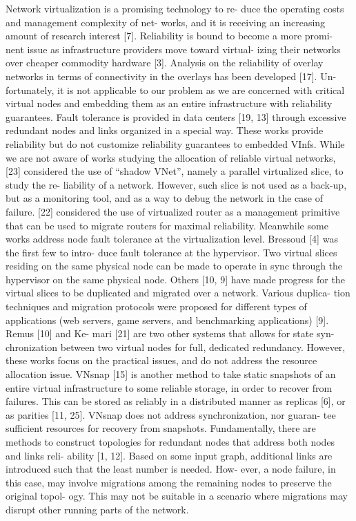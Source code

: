 

Network virtualization is a promising technology to re-
duce the operating costs and management complexity of net-
works, and it is receiving an increasing amount of research
interest [7]. Reliability is bound to become a more promi-
nent issue as infrastructure providers move toward virtual-
izing their networks over cheaper commodity hardware [3].
Analysis on the reliability of overlay networks in terms of
connectivity in the overlays has been developed [17]. Un-
fortunately, it is not applicable to our problem as we are
concerned with critical virtual nodes and embedding them
as an entire infrastructure with reliability guarantees.
Fault tolerance is provided in data centers [19, 13] through
excessive redundant nodes and links organized in a special
way. These works provide reliability but do not customize
reliability guarantees to embedded VInfs.
While we are not aware of works studying the allocation of
reliable virtual networks, [23] considered the use of “shadow
VNet”, namely a parallel virtualized slice, to study the re-
liability of a network. However, such slice is not used as a
back-up, but as a monitoring tool, and as a way to debug
the network in the case of failure. [22] considered the use
of virtualized router as a management primitive that can be
used to migrate routers for maximal reliability.
Meanwhile some works address node fault tolerance at the
virtualization level. Bressoud [4] was the first few to intro-
duce fault tolerance at the hypervisor. Two virtual slices
residing on the same physical node can be made to operate
in sync through the hypervisor on the same physical node.
Others [10, 9] have made progress for the virtual slices to be
duplicated and migrated over a network. Various duplica-
tion techniques and migration protocols were proposed for
different types of applications (web servers, game servers,
and benchmarking applications) [9]. Remus [10] and Ke-
mari [21] are two other systems that allows for state syn-
chronization between two virtual nodes for full, dedicated
redundancy. However, these works focus on the practical
issues, and do not address the resource allocation issue.
VNsnap [15] is another method to take static snapshots of
an entire virtual infrastructure to some reliable storage, in
order to recover from failures. This can be stored as reliably
in a distributed manner as replicas [6], or as parities [11,
25]. VNsnap does not address synchronization, nor guaran-
tee sufficient resources for recovery from snapshots.
Fundamentally, there are methods to construct topologies
for redundant nodes that address both nodes and links reli-
ability [1, 12]. Based on some input graph, additional links
are introduced such that the least number is needed. How-
ever, a node failure, in this case, may involve migrations
among the remaining nodes to preserve the original topol-
ogy. This may not be suitable in a scenario where migrations
may disrupt other running parts of the network.

